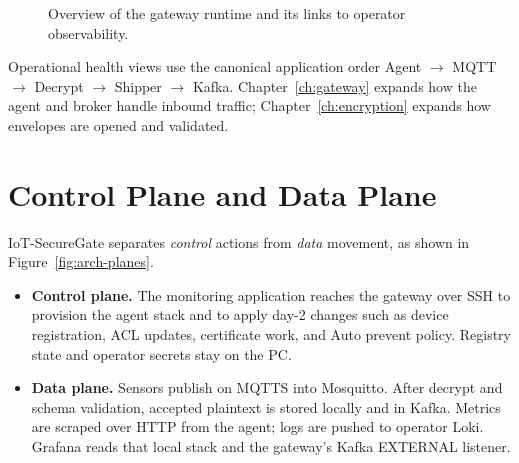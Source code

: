 \documentclass[12pt,a4paper]{report}
\begin{document}
\begin{figure}[htbp]
{%
}
\caption{Overview of the gateway runtime and its links to
operator observability.}
\label{fig:arch-gateway}
\end{figure}

Operational health views use the canonical application
order Agent $\rightarrow$ MQTT $\rightarrow$ Decrypt
$\rightarrow$ Shipper $\rightarrow$ Kafka.
Chapter~\ref{ch:gateway} expands how the agent and
broker handle inbound traffic;
Chapter~\ref{ch:encryption} expands how envelopes are
opened and validated.

\section{Control Plane and Data Plane}
\label{sec:arch-planes}

IoT-SecureGate separates \emph{control} actions from
\emph{data} movement, as shown in
Figure~\ref{fig:arch-planes}.

\begin{itemize}
    \item \textbf{Control plane.}
    The monitoring application reaches the gateway over
    SSH to provision the agent stack and to apply day-2
    changes such as device registration, ACL updates,
    certificate work, and Auto prevent policy. Registry
    state and operator secrets stay on the PC.
    \item \textbf{Data plane.}
    Sensors publish on MQTTS into Mosquitto. After decrypt
    and schema validation, accepted plaintext is stored
    locally and in Kafka. Metrics are scraped over HTTP
    from the agent; logs are pushed to operator Loki.
    Grafana reads that local stack and the gateway's Kafka
    EXTERNAL listener.
\end{itemize}
\end{document}

